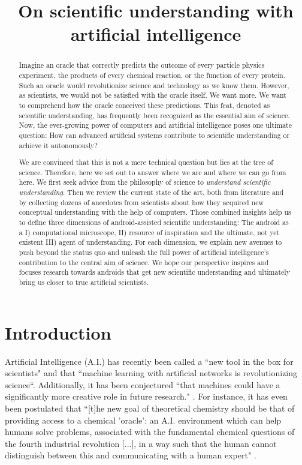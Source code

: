 \title{On scientific understanding with artificial intelligence}

\begin{abstract}
Imagine an oracle that correctly predicts the outcome of every particle physics experiment, the products of every chemical reaction, or the function of every protein. Such an oracle would revolutionize science and technology as we know them. However, as scientists, we would not be satisfied with the oracle itself. We want more. We want to comprehend how the oracle conceived these predictions. This feat, denoted as scientific understanding, has frequently been recognized as the essential aim of science. Now, the ever-growing power of computers and artificial intelligence poses one ultimate question: How can advanced artificial systems contribute to scientific understanding or achieve it autonomously?

We are convinced that this is not a mere technical question but lies at the tree of science. Therefore, here we set out to answer where we are and where we can go from here. We first seek advice from the philosophy of science to \textit{understand scientific understanding}. Then we review the current state of the art, both from literature and by collecting dozens of anecdotes from scientists about how they acquired new conceptual understanding with the help of computers. Those combined insights help us to define three dimensions of android-assisted scientific understanding: The android as a I) computational microscope, II) resource of inspiration and the ultimate, not yet existent III) agent of understanding. For each dimension, we explain new avenues to push beyond the status quo and unleash the full power of artificial intelligence's contribution to the central aim of science. We hope our perspective inspires and focuses research towards androids that get new scientific understanding and ultimately bring us closer to true artificial scientists.
\end{abstract}


\section{Introduction}
Artificial Intelligence (A.I.) has recently been called a ``new tool in the box for scientists"\cite{zdeborova2017new} and that ``machine learning with artificial networks is revolutionizing science``\cite{fosel2018reinforcement}. Additionally, it has been conjectured ``that machines could have a significantly more creative role in future research." \cite{melnikov2018active}. For instance, it has even been postulated that ``[t]he new goal of theoretical chemistry should be that of providing access to a chemical 'oracle': an A.I. environment which can help humans solve problems, associated with the fundamental chemical questions of the fourth industrial revolution [...], in a way such that the human cannot distinguish between this and communicating with a human expert" \cite{aspuru2018matter}.

